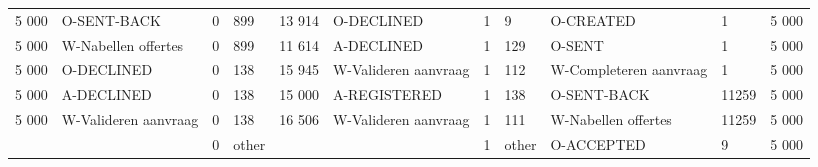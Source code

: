 \begin{tabular}{llllllllllr}
5 000 & O-SENT-BACK & 0 & 899 & 13 914 & O-DECLINED & 1 & 9 & O-CREATED & 1 & 5 000 \\
5 000 & W-Nabellen offertes & 0 & 899 & 11 614 & A-DECLINED & 1 & 129 & O-SENT & 1 & 5 000 \\
5 000 & O-DECLINED & 0 & 138 & 15 945 & W-Valideren aanvraag & 1 & 112 & W-Completeren aanvraag & 1 & 5 000 \\
5 000 & A-DECLINED & 0 & 138 & 15 000 & A-REGISTERED & 1 & 138 & O-SENT-BACK & 11259 & 5 000 \\
5 000 & W-Valideren aanvraag & 0 & 138 & 16 506 & W-Valideren aanvraag & 1 & 111 & W-Nabellen offertes & 11259 & 5 000 \\
 &  & 0 & other &  &  & 1 & other & O-ACCEPTED & 9 & 5 000 \\
\bottomrule
\end{tabular}
